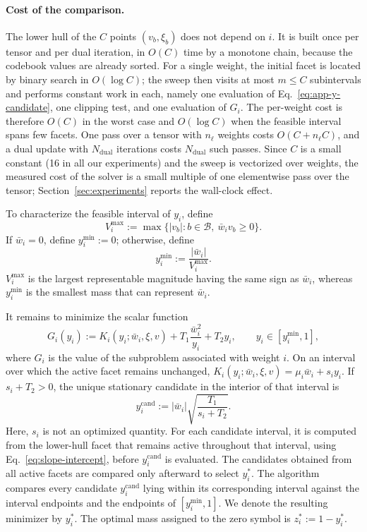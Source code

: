 \documentclass{article}
\begin{document}
\paragraph{Cost of the comparison.}
The lower hull of the $C$ points $(v_b,\xi_b)$ does not depend on $i$. It is
built once per tensor and per dual iteration, in $O(C)$ time by a monotone
chain, because the codebook values are already sorted. For a single weight, the
initial facet is located by binary search in $O(\log C)$; the sweep then visits
at most $m\leq C$ subintervals and performs constant work in each, namely one
evaluation of Eq.~\eqref{eq:app-y-candidate}, one clipping test, and one evaluation
of $G_i$. The per-weight cost is therefore $O(C)$ in the worst case and
$O(\log C)$ when the feasible interval spans few facets. One pass over a tensor
with $n_\ell$ weights costs $O(C+n_\ell C)$, and a dual update with
$N_{\mathrm{dual}}$ iterations costs $N_{\mathrm{dual}}$ such passes. Since $C$
is a small constant (16 in all our experiments) and the sweep is vectorized
over weights, the measured cost of the solver is a small multiple of one
elementwise pass over the tensor; Section~\ref{sec:experiments} reports the
wall-clock effect.

To characterize the feasible interval of $y_i$, define
\[
  V_i^{\max}
  :=
  \max\{|v_b|:b\in\mathcal B,\ \bar w_i v_b\geq0\}.
\]
If $\bar w_i=0$, define $y_i^{\min}:=0$; otherwise, define
\[
  y_i^{\min}:=\frac{|\bar w_i|}{V_i^{\max}}.
\]
$V_i^{\max}$ is the largest representable magnitude having the same sign as
$\bar w_i$, whereas $y_i^{\min}$ is the smallest mass that can represent
$\bar w_i$.

It remains to minimize the scalar function
\begin{equation}
  G_i(y_i)
  :=
  K_i(y_i;\bar w_i,\xi,v)
  +T_1\frac{\bar w_i^2}{y_i}
  +T_2y_i,
  \qquad
  y_i\in[y_i^{\min},1],
  \label{eq:app-scalar-problem}
\end{equation}
where $G_i$ is the value of the subproblem associated with weight $i$. On an
interval over which the active facet remains unchanged,
$K_i(y_i;\bar w_i,\xi,v)=\mu_i\bar w_i+s_i y_i$. If $s_i+T_2>0$, the unique
stationary candidate in the interior of that interval is
\begin{equation}
  y_i^{\mathrm{cand}}
  :=
  |\bar w_i|
  \sqrt{\frac{T_1}{s_i+T_2}}.
  \label{eq:app-y-candidate}
\end{equation}
Here, $s_i$ is not an optimized quantity. For each candidate interval, it is
computed from the lower-hull facet that remains active throughout that
interval, using Eq.~\eqref{eq:slope-intercept}, before
$y_i^{\mathrm{cand}}$ is evaluated. The candidates obtained from all active
facets are compared only afterward to select $y_i^*$. 
The algorithm compares every candidate $y_i^{\mathrm{cand}}$ lying within its
corresponding interval against the interval endpoints and the endpoints of
$[y_i^{\min},1]$. We denote the resulting minimizer by $y_i^*$. The optimal
mass assigned to the zero symbol is $z_i^*:=1-y_i^*$.
\end{document}
